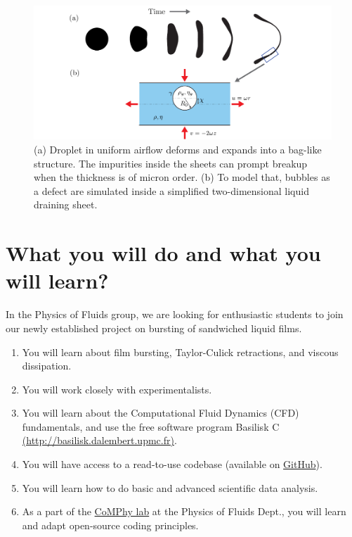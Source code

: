 \documentclass[a4paper,10pt]{article}
\begin{document}
\begin{figure}[h]
\centering
\includegraphics[width=\textwidth]{schematic_02.pdf}
\caption{(a) Droplet in uniform airflow deforms and expands into a bag-like structure. The impurities inside the sheets can prompt breakup when the thickness is of micron order. (b) To model that, bubbles as a defect are simulated inside a simplified two-dimensional liquid draining sheet.}
\label{fig:droplets2021}
\end{figure}

\section*{What you will do and what you will learn?}
In the Physics of Fluids group, we are looking for enthusiastic students to join our newly established project on bursting of sandwiched liquid films.

\begin{enumerate}
\item You will learn about film bursting, Taylor-Culick retractions, and viscous dissipation. 
\item You will work closely with experimentalists. 
\item You will learn about the Computational Fluid Dynamics (CFD) fundamentals, and use the free software program Basilisk C \href{http://basilisk.dalembert.upmc.fr}{(http://basilisk.dalembert.upmc.fr)}.
\item You will have access to a read-to-use codebase (available on \href{https://github.com/comphy-lab/bubbleinSheet}{GitHub}).
\item You will learn how to do basic and advanced scientific data analysis.
\item As a part of the \href{https://comphy-lab.org}{CoMPhy lab} at the Physics of Fluids Dept., you will learn and adapt open-source coding principles. 
\end{enumerate}
\end{document}

